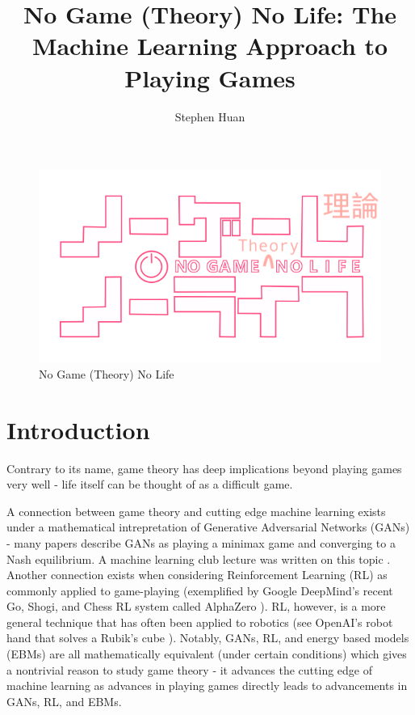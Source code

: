 \documentclass[11pt, oneside]{article}
\title{No Game (Theory) No Life: The Machine Learning Approach to Playing Games}
\author{Stephen Huan}
\begin{document}
\maketitle

\begin{figure}[h!]
  \centering
  \includegraphics[scale=0.40]{no_game_theory_no_life}
  \caption{No Game (Theory) No Life \cite{ngnl}}
\end{figure}

\section{Introduction}

Contrary to its name, game theory has deep implications beyond playing
games very well - life itself can be thought of as a difficult game.

A connection between game theory and cutting edge machine learning exists
under a mathematical intrepretation of Generative Adversarial Networks (GANs)
- many papers describe GANs as playing a minimax game and converging to a Nash equilibrium.
A machine learning club lecture was written on this topic \cite{thistlethwaite}.
Another connection exists when considering Reinforcement Learning (RL) as
commonly applied to game-playing (exemplified by Google DeepMind's recent
Go, Shogi, and Chess RL system called AlphaZero \cite{DBLP:journals/corr/abs-1712-01815}).
RL, however, is a more general technique that has often been applied
to robotics (see OpenAI's robot hand that solves a Rubik's cube \cite{2019arXiv191007113O}).
Notably, GANs, RL,
and energy based models (EBMs) are all mathematically equivalent (under certain conditions)
\cite{DBLP:journals/corr/FinnCAL16} which gives a nontrivial reason to study game theory -
it advances the cutting edge of machine learning as advances in playing games
directly leads to advancements in GANs, RL, and EBMs.
\end{document}
